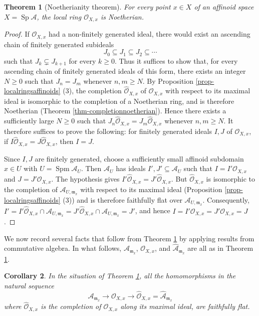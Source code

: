 \documentclass[a4paper,12pt, dvipdfmx]{jsbook}
\def\O{\mathscr{O}}
\def\m{\mathfrak{m}}
\def\Spm{\mathop{\mathrm{Spm}}\nolimits}
\def\Sp{\mathop{\mathrm{Sp}}\nolimits}
\theoremstyle{plain}
\newtheorem{thm}{\bfseries Theorem}[section]
\newtheorem{cor}[thm]{\bfseries Corollary}
\theoremstyle{definition}
\begin{document}
\begin{thm}[Noetherianity theorem]\label{thm-localringsaffinoids}{\rm 
For every point $x\in X$ of an affinoid space $X=\Sp\mathcal{A}$, the local ring $\O_{X,x}$ is Noetherian.}
\end{thm}

\begin{proof}[Proof]
If $\O_{X,x}$ had a non-finitely generated ideal, there would exist an ascending chain of finitely generated subideals
$$
J_0\subseteq J_1\subseteq J_2\subseteq\cdots
$$
such that $J_k\subsetneq J_{k+1}$ for every $k\geq 0$.
Thus it suffices to show that, for every ascending chain of finitely generated ideals of this form, there exists an integer $N\geq 0$ such that $J_n=J_m$ whenever $n,m\geq N$.
By Proposition \ref{prop-localringsaffinoids} (3), the completion $\widehat{\O}_{X,x}$ of $\O_{X,x}$ with respect to its maximal ideal is isomorphic to the completion of a Noetherian ring, and is therefore Noetherian (Theorem \ref{thm-completionnoetherian}).
Hence there exists a sufficiently large $N\geq 0$ such that $J_n\widehat{\O}_{X,x}=J_m\widehat{\O}_{X,x}$ whenever $n,m\geq N$.
It therefore suffices to prove the following: for finitely generated ideals $I,J$ of $\O_{X,x}$, if $I\widehat{\O}_{X,x}=J\widehat{\O}_{X,x}$, then $I=J$.

Since $I,J$ are finitely generated, choose a sufficiently small affinoid subdomain $x\in U$ with $U=\Spm\mathcal{A}_U$. Then $\mathcal{A}_U$ has ideals $I',J'\subseteq\mathcal{A}_U$ such that $I=I'\O_{X,x}$ and $J=J'\O_{X,x}$.
The hypothesis gives $I'\widehat{\O}_{X,x}=J'\widehat{\O}_{X,x}$.
But $\widehat{\O}_{X,x}$ is isomorphic to the completion of $\mathcal{A}_{U,\m_x}$ with respect to its maximal ideal (Proposition \ref{prop-localringsaffinoids} (3)) and is therefore faithfully flat over $\mathcal{A}_{U,\m_x}$.
Consequently, $I'=I'\widehat{\O}_{X,x}\cap\mathcal{A}_{U,\m_x}=J'\widehat{\O}_{X,x}\cap\mathcal{A}_{U,\m_x}=J'$, and hence $I=I'\O_{X,x}=J'\O_{X,x}=J$.
\end{proof}

We now record several facts that follow from Theorem \ref{thm-localringsaffinoids} by applying results from commutative algebra.
In what follows, $\mathcal{A}_{\m_x}$, $\O_{X,x}$, and $\widehat{\mathcal{A}}_{\m_x}$ are all as in Theorem \ref{thm-localringsaffinoids}.
\begin{cor}\label{cor-localringsaffinoids}{\rm 
In the situation of Theorem \ref{thm-localringsaffinoids}, all the homomorphisms in the natural sequence
$$
\mathcal{A}_{\m_x}\longrightarrow\O_{X,x}\longrightarrow\widehat{\O}_{X,x}=\widehat{\mathcal{A}}_{\m_x}
$$
where $\widehat{\O}_{X,x}$ is the completion of $\O_{X,x}$ along its maximal ideal, are faithfully flat.}
\end{cor}
\end{document}
